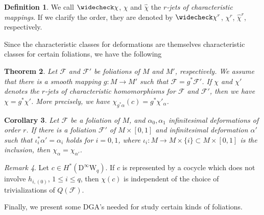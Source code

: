 \documentclass[12pt]{amsart}
\newcommand{\CF}{{\mathcal F}}
\newcommand{\W}{\mathrm{W}}
\newcommand{\D}{\mathrm{D}}
\newtheorem{theorem}{Theorem}[section]
\newtheorem{corollary}[theorem]{Corollary}
\theoremstyle{definition}
\newtheorem{definition}[theorem]{Definition}
\theoremstyle{remark}
\newtheorem{remark}[theorem]{Remark}
\begin{document}
\begin{definition}
We call $\widecheck\chi$, $\chi$ and $\widehat\chi$ the \textit{$r$-jets of characteristic mappings}.
If we clarify the order, they are denoted by $\widecheck\chi^r$, $\chi^r$, $\widehat\chi^r$, respectively.
\end{definition}

Since the characteristic classes for deformations are themselves characteristic classes for certain foliations, we have the following

\begin{theorem}
Let $\CF$ and $\CF'$ be foliations of $M$ and $M'$, respectively.
We assume that there is a smooth mapping $g\colon M\to M'$ such that $\CF=g^*\CF'$.
If $\chi$ and $\chi'$ denotes the $r$-jets of characteristic homomorphisms for $\CF$ and $\CF'$, then we have $\chi=g^*\chi'$.
More precisely, we have $\chi_{g^*\alpha}(c)=g^*\chi'_\alpha$.
\end{theorem}

\begin{corollary}
Let $\CF$ be a foliation of $M$, and $\alpha_0,\alpha_1$ infinitesimal deformations of order $r$.
If there is a foliation $\mathcal{F}'$ of $M\times[0,1]$ and infinitesimal deformation $\alpha'$ such that $\iota^*_i\alpha'=\alpha_i$ holds for $i=0,1$, where $\iota_i\colon M\to M\times\{i\}\subset M\times[0,1]$ is the inclusion, then $\chi_\alpha=\chi_{\alpha'}$.
\end{corollary}

\begin{remark}
Let $c\in H^*(\D^\infty\W_q)$.
If $c$ is represented by a cocycle which does not involve $h_{i,(0)}$, $1\leq i\leq q$, then $\chi(c)$ is independent of the choice of trivializations of $Q(\CF)$.
\end{remark}

Finally, we present some DGA's needed for study certain kinds of foliations.
\end{document}
